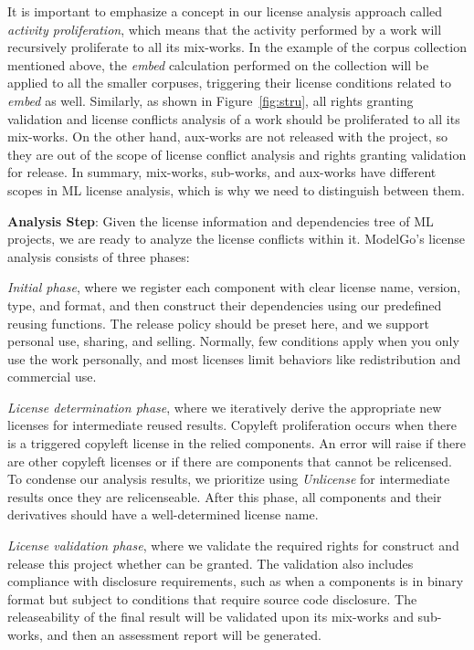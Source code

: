 It is important to emphasize a concept in our license analysis approach called \textit{activity proliferation}, which means that the activity performed by a work will recursively proliferate to all its mix-works.
In the example of the corpus collection mentioned above, the \textit{embed} calculation performed on the collection will be applied to all the smaller corpuses, triggering their license conditions related to \textit{embed} as well.
Similarly, as shown in Figure~\ref{fig:stru}, all rights granting validation and license conflicts analysis of a work should be proliferated to all its mix-works.
On the other hand, aux-works are not released with the project, so they are out of the scope of license conflict analysis and rights granting validation for release.
In summary, mix-works, sub-works, and aux-works have different scopes in ML license analysis, which is why we need to distinguish between them.

\textbf{Analysis Step}:
Given the license information and dependencies tree of ML projects, we are ready to analyze the license conflicts within it. 
ModelGo's license analysis consists of three phases:

\textit{Initial phase}, where we register each component with clear license name, version, type, and format, and then construct their dependencies using our predefined reusing functions.
The release policy should be preset here, and we support personal use, sharing, and selling. 
Normally, few conditions apply when you only use the work personally, and most licenses limit behaviors like redistribution and commercial use.

\textit{License determination phase}, where we iteratively derive the appropriate new licenses for intermediate reused results.
Copyleft proliferation occurs when there is a triggered copyleft license in the relied components.
An error will raise if there are other copyleft licenses or if there are components that cannot be relicensed.
To condense our analysis results, we prioritize using \textit{Unlicense} for intermediate results once they are relicenseable.
After this phase, all components and their derivatives should have a well-determined license name.

\textit{License validation phase}, where we validate the required rights for construct and release this project whether can be granted.
The validation also includes compliance with disclosure requirements, such as when a components is in binary format but subject to conditions that require source code disclosure.
The releaseability of the final result will be validated upon its mix-works and sub-works, and then an assessment report will be generated.


